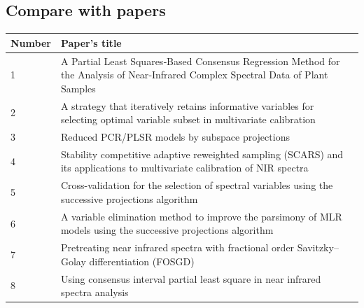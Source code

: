 \documentclass[a4paper,12pt,titlepage]{article} %
\numberwithin{equation}{section}  %
\begin{document}
	\subsection{Compare with papers}
	\label{sec:Compare with papers}
	

	
	\begin{landscape}
		
\begin{table}[]
	\begin{tabular}{ll}
		\hline
		Number & Paper's title \\ \hline
		1 & A Partial Least Squares‐Based Consensus Regression Method for the Analysis of Near‐Infrared Complex Spectral Data of Plant Samples \\
		2 & A strategy that iteratively retains informative variables for selecting optimal variable subset in multivariate calibration \\
		3 & Reduced PCR/PLSR models by subspace projections \\
		4 & Stability competitive adaptive reweighted sampling (SCARS) and its applications to multivariate calibration of NIR spectra \\
		5 & Cross-validation for the selection of spectral variables using the successive projections algorithm \\
		6 & A variable elimination method to improve the parsimony of MLR models using the successive projections algorithm \\
		7 & Pretreating near infrared spectra with fractional order Savitzky–Golay differentiation (FOSGD) \\
		8 & Using consensus interval partial least square in near infrared spectra analysis
	\end{tabular}

\label{tab:papers}
\end{table}

    \end{landscape}
\end{document}
